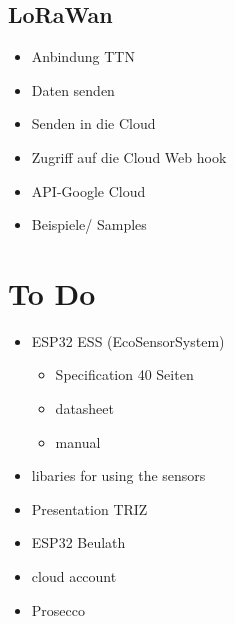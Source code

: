 

\section{LoRaWan}

\begin{itemize}
  \item Anbindung TTN
  \item Daten senden
  \item Senden in die Cloud
  \item Zugriff auf die Cloud Web hook
  \item API-Google Cloud
  \item Beispiele/ Samples
\end{itemize}


\newpage

%
%

\chapter{To Do}


\begin{itemize}
  \item ESP32 ESS (EcoSensorSystem) 
    \begin{itemize}
       \item Specification 40 Seiten
       \item datasheet
       \item manual
     \end{itemize}
  \item  libaries for using the sensors
  \item Presentation TRIZ
  \item ESP32 Beulath
  \item cloud account
  \item Prosecco
\end{itemize}


